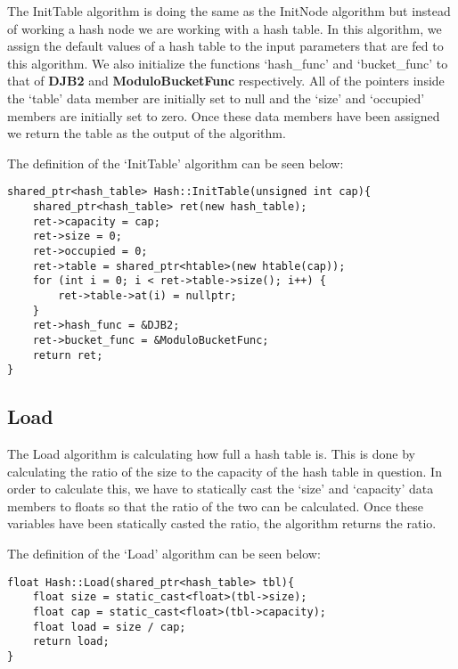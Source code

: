 The InitTable algorithm is doing the same as the InitNode algorithm but instead of working a hash node we are working with a hash table. In this algorithm, we assign the default values of a hash table to
the input parameters that are fed to this algorithm. We also initialize the functions `hash\_func' and `bucket\_func' to that of \textbf{DJB2} and \textbf{ModuloBucketFunc} respectively. All of the pointers
inside the `table' data member are initially set to null and the `size' and `occupied' members are initially set to zero. Once these data members have been assigned we return the table as the output of the
algorithm.

\begin{highlight}

The definition of the `InitTable' algorithm can be seen below:

\horizontalline

\begin{verbatim}
shared_ptr<hash_table> Hash::InitTable(unsigned int cap){
    shared_ptr<hash_table> ret(new hash_table);
    ret->capacity = cap;
    ret->size = 0;
    ret->occupied = 0;
    ret->table = shared_ptr<htable>(new htable(cap));
    for (int i = 0; i < ret->table->size(); i++) {
        ret->table->at(i) = nullptr;
    }
    ret->hash_func = &DJB2;
    ret->bucket_func = &ModuloBucketFunc;
    return ret;
}
\end{verbatim}
    
\end{highlight}

\subsection*{Load}

The Load algorithm is calculating how full a hash table is. This is done by calculating the ratio of the size to the capacity of the hash table in question. In order to calculate this, we have to statically cast
the `size' and `capacity' data members to floats so that the ratio of the two can be calculated. Once these variables have been statically casted the ratio, the algorithm returns the ratio.

\begin{highlight}

The definition of the `Load' algorithm can be seen below:

\horizontalline

\begin{verbatim}
float Hash::Load(shared_ptr<hash_table> tbl){
    float size = static_cast<float>(tbl->size);
    float cap = static_cast<float>(tbl->capacity);
    float load = size / cap;
    return load;
}
\end{verbatim}

\end{highlight}

